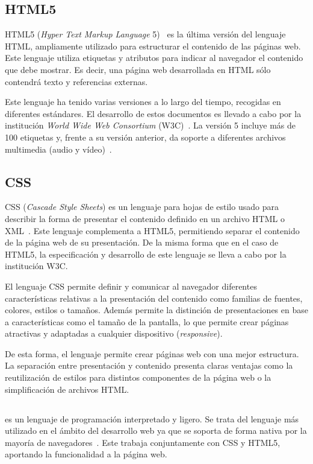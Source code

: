 \subsection{HTML5}
HTML5 (\textit{Hyper Text Markup Language} 5)~\cite{html5-standard} es la última versión del lenguaje HTML, ampliamente utilizado para estructurar el contenido de las páginas web. Este lenguaje utiliza etiquetas y atributos para indicar al navegador el contenido que debe mostrar. Es decir, una página web desarrollada en HTML sólo contendrá texto y referencias externas. 

Este lenguaje ha tenido varias versiones a lo largo del tiempo, recogidas en diferentes estándares. El desarrollo de estos documentos es llevado a cabo por la institución \textit{World Wide Web Consortium} (W3C)~\cite{www-consortium}\@. La versión 5 incluye más de 100 etiquetas y, frente a su versión anterior, da soporte a diferentes archivos multimedia (audio y vídeo)~\cite{htm4vshtml5}\@.

\subsection{CSS}

CSS (\textit{Cascade Style Sheets}) es un lenguaje para hojas de estilo usado para describir la forma de presentar el contenido definido en un archivo HTML o XML~\cite{css}\@. Este lenguaje complementa a HTML5, permitiendo separar el contenido de la página web de su presentación. De la misma forma que en el caso de HTML5, la especificación y desarrollo de este lenguaje se lleva a cabo por la institución W3C.

El lenguaje CSS permite definir y comunicar al navegador diferentes características relativas a la presentación del contenido como familias de fuentes, colores, estilos o tamaños. Además permite la distinción de presentaciones en base a características como el tamaño de la pantalla, lo que permite crear páginas atractivas y adaptadas a cualquier dispositivo (\textit{responsive}). 

De esta forma, el lenguaje permite crear páginas web con una mejor estructura. La separación entre presentación y contenido presenta claras ventajas como la reutilización de estilos para distintos componentes de la página web o la simplificación de archivos HTML\@.

\subsection{\js}
{\js} es un lenguaje de programación interpretado y ligero. Se trata del lenguaje más utilizado en el ámbito del desarrollo web ya que se soporta de forma nativa por la mayoría de navegadores~\cite{javascript}\@. Este trabaja conjuntamente con CSS y HTML5, aportando la funcionalidad a la página web.

